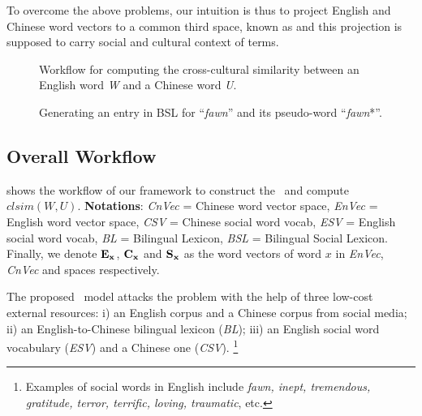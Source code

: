 To overcome the above problems, our intuition is thus 
to project English and Chinese word vectors to a common third space, 
known as \textit{\socvec} and this projection is supposed to carry 
social and cultural context of terms.
%
\begin{figure}[t]
	\centering
	\caption{Workflow for computing the cross-cultural similarity between 
an English word \textit{W} and a Chinese word \textit{U}.}
\vspace{-15pt}
	\label{fig:overview}
\end{figure}

\begin{figure*}[th]
	\centering
	\caption{\small Generating an entry in BSL for ``\textit{fawn}'' 
		and its pseudo-word ``\textit{fawn}*''.}
	\label{fig:BSL}
	\vspace{-10pt}
\end{figure*}
\subsection{Overall Workflow}
 shows the workflow of our framework to construct the \textit{\socvec}~and compute $clsim(W,U)$. 
{\textbf{Notations}: \textit{CnVec} = Chinese word vector space, \textit{EnVec} = English word vector space,
	\textit{CSV} = Chinese social word vocab, \textit{ESV} = English social word vocab,
	\textit{BL} = Bilingual Lexicon, \textit{BSL} = Bilingual Social Lexicon. Finally, we denote $\bf{E_x}$, $\bf{C_x}$ and $\bf{S_x}$ as the word vectors of 
	word $x$ in \textit{EnVec}, \textit{CnVec} and \textit{\socvec} spaces
	respectively.}

The proposed \textit{\socvec}~model attacks the problem with the help of three low-cost external resources: 
i) an English corpus and a Chinese corpus from social media; ii) an English-to-Chinese bilingual lexicon (\textit{BL});  
iii) an English social word vocabulary (\textit{ESV}) and a Chinese one
(\textit{CSV}).
\footnote{Examples of social words in English include
\textit{fawn, inept, tremendous, gratitude,
terror, terrific, loving, traumatic}, etc.}


